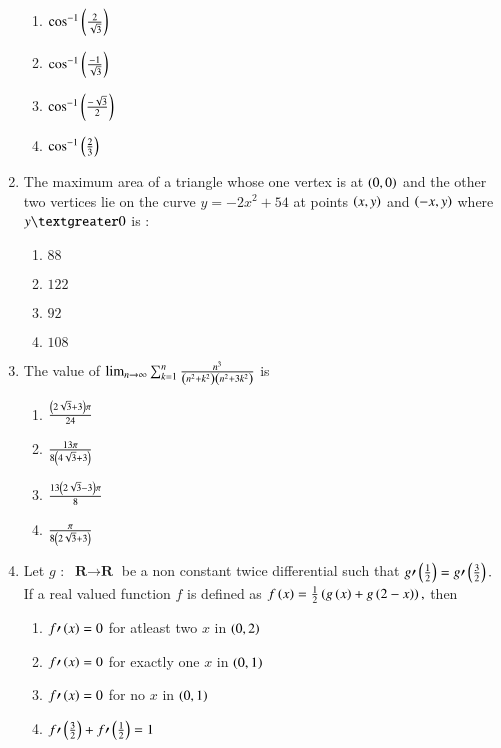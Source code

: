 \documentclass[journal,12pt,twocolumn]{IEEEtran}
\theoremstyle{remark}
\begin{document}
\begin{enumerate}
    \begin{enumerate}
        \item $\cos^{-1}\left(\frac{2}{\sqrt{3}}\right)$
        \item $\cos^{-1}\left(\frac{-1}{\sqrt{3}}\right)$
        \item $\cos^{-1}\left(\frac{-\sqrt{3}}{2}\right)$
        \item $\cos^{-1}\left(\frac{2}{3}\right)$
    \end{enumerate}
    \item The maximum area of a triangle whose one vertex is at $\left(0,0\right)$ and the other two vertices lie on the curve $y=-2x^2+54$ at points $\left(x,y\right)$ and $\left(-x,y\right)$ where $y\textgreater 0$ is $:$\\
    \begin{enumerate}
        \item $88$
        \item $122$
        \item $92$
        \item $108$
    \end{enumerate}
    \item The value of $\lim_{n \to \infty}\sum_{k=1}^n\frac{n^3}{\left(n^2+k^2\right)\left(n^2+3k^2\right)}$ is \\
    \begin{enumerate}
        \item $\frac{\left(2\sqrt{3}+3\right)\pi}{24}$
        \item $\frac{13\pi}{8\left(4\sqrt{3}+3\right)}$
        \item $\frac{13\left(2\sqrt{3}-3\right)\pi}{8}$
        \item $\frac{\pi}{8\left(2\sqrt{3}+3\right)}$
    \end{enumerate}
    \item Let $g$ $:$ $\textbf{R}\to\textbf{R}$ be a non constant twice differential such that $g\prime\left(\frac{1}{2}\right)=g\prime\left(\frac{3}{2}\right).$ If a real valued function $f$ is defined as $f\left(x\right)=\frac{1}{2}\left(g\left(x\right)+g\left(2-x\right)\right),$ then\\
    \begin{enumerate}
        \item $f\prime\left(x\right)=0$ for atleast two $x$ in $\left(0,2\right)$
        \item $f\prime\left(x\right)=0$ for exactly one $x$ in $\left(0,1\right)$
        \item $f\prime\left(x\right)=0$ for no $x$ in $\left(0,1\right)$
        \item $f\prime\left(\frac{3}{2}\right)+f\prime\left(\frac{1}{2}\right)=1$

\end{enumerate}
\end{enumerate}
\end{document}
